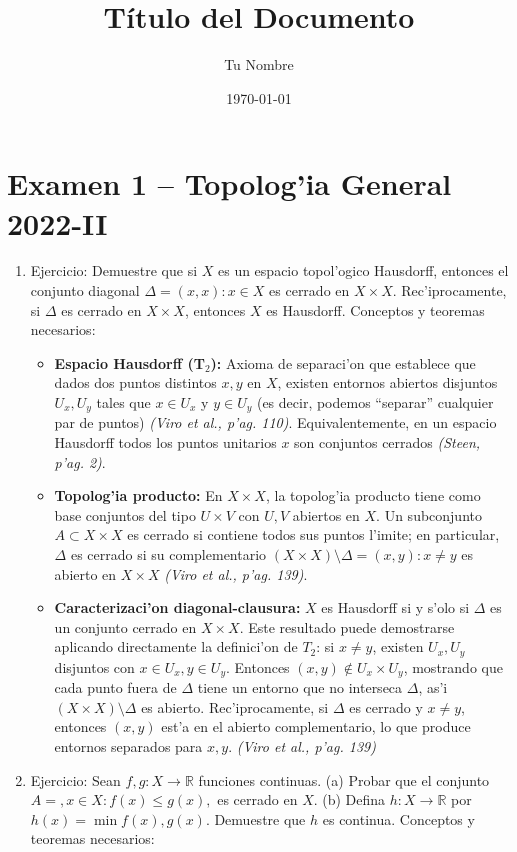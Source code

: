 \documentclass[a4paper,11pt]{article}  %
\title{Título del Documento}
\author{Tu Nombre}
\date{\today}                  %
\begin{document}
\section{Examen 1 -- Topolog'ia General 2022-II}
\begin{enumerate}
\item Ejercicio: Demuestre que si $X$ es un espacio topol'ogico Hausdorff, entonces el conjunto diagonal $\Delta = {(x,x): x\in X}$ es cerrado en $X\times X$. Rec'iprocamente, si $\Delta$ es cerrado en $X\times X$, entonces $X$ es Hausdorff. Conceptos y teoremas necesarios:
\begin{itemize}
\item \textbf{Espacio Hausdorff (T$_2$):} Axioma de separaci'on que establece que dados dos puntos distintos $x,y$ en $X$, existen entornos abiertos disjuntos $U_x, U_y$ tales que $x\in U_x$ y $y\in U_y$ (es decir, podemos “separar” cualquier par de puntos) \emph{(Viro et al., p'ag. 110)}. Equivalentemente, en un espacio Hausdorff todos los puntos unitarios ${x}$ son conjuntos cerrados \emph{(Steen, p'ag. 2)}.
\item \textbf{Topolog'ia producto:} En $X\times X$, la topolog'ia producto tiene como base conjuntos del tipo $U\times V$ con $U,V$ abiertos en $X$. Un subconjunto $A\subset X\times X$ es cerrado si contiene todos sus puntos l'imite; en particular, $\Delta$ es cerrado si su complementario $(X\times X)\setminus \Delta = {(x,y): x\neq y}$ es abierto en $X\times X$ \emph{(Viro et al., p'ag. 139)}.
\item \textbf{Caracterizaci'on diagonal-clausura:} $X$ es Hausdorff si y s'olo si $\Delta$ es un conjunto cerrado en $X\times X$. Este resultado puede demostrarse aplicando directamente la definici'on de $T_2$: si $x\neq y$, existen $U_x, U_y$ disjuntos con $x\in U_x, y\in U_y$. Entonces $(x,y)\notin U_x\times U_y$, mostrando que cada punto fuera de $\Delta$ tiene un entorno que no interseca $\Delta$, as'i $(X\times X)\setminus\Delta$ es abierto. Rec'iprocamente, si $\Delta$ es cerrado y $x\neq y$, entonces $(x,y)$ est'a en el abierto complementario, lo que produce entornos separados para $x,y$. \emph{(Viro et al., p'ag. 139)}
\end{itemize} \item Ejercicio: Sean $f,g: X\to \mathbb{R}$ funciones continuas.
(a) Probar que el conjunto $A={,x\in X: f(x)\le g(x),}$ es cerrado en $X$.
(b) Defina $h: X\to\mathbb{R}$ por $h(x)=\min{f(x),g(x)}$. Demuestre que $h$ es continua. Conceptos y teoremas necesarios:
\begin{itemize}

\end{itemize}
\end{enumerate}
\end{document}
